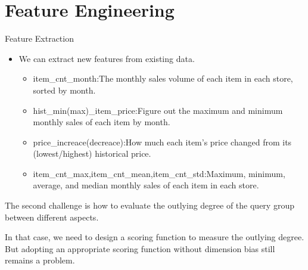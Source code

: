 \documentclass[
 size=14pt,
 paper=smartboard,  %
 mode=present, 		%
 display=slides, 	%
 style=tuliplab,  	%
 pauseslide,
 fleqn,leqno]{powerdot}
\begin{document}
  \section{Feature Engineering}
  \begin{slide}[toc=,bm=]{Feature Extraction}

  \begin{itemize}
  \item
  We can extract new features from existing data.
  
  \begin{itemize}
  \item
  item_cnt_month:The monthly sales volume of each item in each store, sorted by month.
  \item
  hist_min(max)_item_price:Figure out the maximum and minimum monthly sales of each item by month.
  \item
  price_increace(decreace):How much each item's price changed from its (lowest/highest) historical price.
  \item
  item_cnt_max,item_cnt_mean,item_cnt_std:Maximum, minimum, average, and median monthly sales of each item in each store.
  \end{itemize}
  \end{itemize}
  
  \begin{note}
  The second challenge is how to evaluate the outlying degree of
  the query group between different aspects.
  
  In that case,
  we need to design a scoring function to measure the outlying degree.
  But adopting an appropriate scoring function without dimension bias still remains a problem.
  \end{note}
  
  \end{slide}
\end{document}
